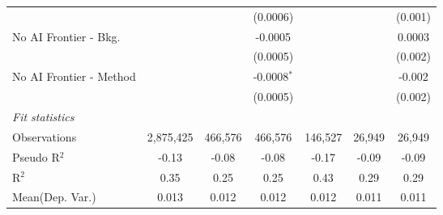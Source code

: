 \begin{tabular}{lcccccc}
                           &               &               & (0.0006)      &              &          & (0.001)\\   
   No AI Frontier - Bkg.   &               &               & -0.0005       &              &          & 0.0003\\   
                           &               &               & (0.0005)      &              &          & (0.002)\\   
   No AI Frontier - Method &               &               & -0.0008$^{*}$ &              &          & -0.002\\   
                           &               &               & (0.0005)      &              &          & (0.002)\\   
   \midrule
   \emph{Fit statistics}\\
   Observations            & 2,875,425     & 466,576       & 466,576       & 146,527      & 26,949   & 26,949\\  
   Pseudo R$^2$            & -0.13         & -0.08         & -0.08         & -0.17        & -0.09    & -0.09\\  
   R$^2$                   & 0.35          & 0.25          & 0.25          & 0.43         & 0.29     & 0.29\\  
Mean(Dep. Var.) & 0.013 & 0.012 & 0.012 & 0.012 & 0.011 & 0.011 \\
   

\end{tabular}

